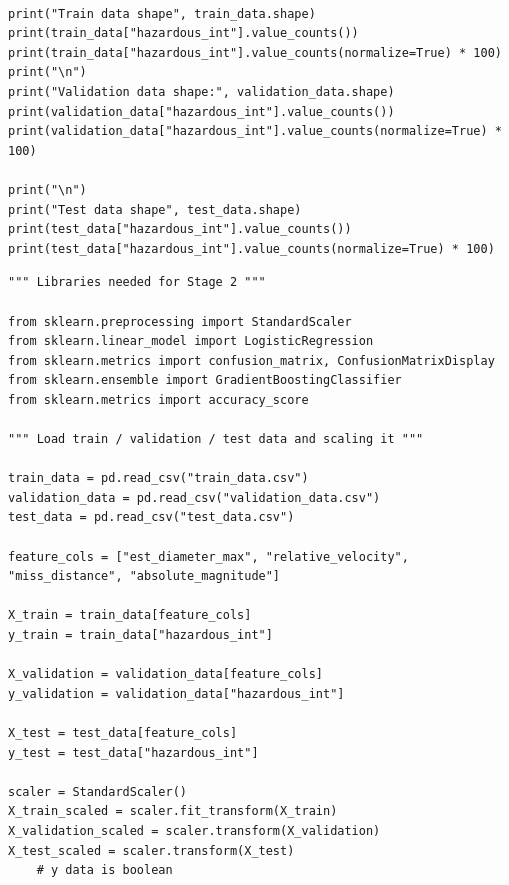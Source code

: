 \documentclass{article}
\begin{document}
\begin{lstlisting}

print("Train data shape", train_data.shape)
print(train_data["hazardous_int"].value_counts())
print(train_data["hazardous_int"].value_counts(normalize=True) * 100)
print("\n")
print("Validation data shape:", validation_data.shape)
print(validation_data["hazardous_int"].value_counts())
print(validation_data["hazardous_int"].value_counts(normalize=True) * 100)

print("\n")
print("Test data shape", test_data.shape)
print(test_data["hazardous_int"].value_counts())
print(test_data["hazardous_int"].value_counts(normalize=True) * 100)

\end{lstlisting}

\begin{lstlisting}
""" Libraries needed for Stage 2 """

from sklearn.preprocessing import StandardScaler
from sklearn.linear_model import LogisticRegression
from sklearn.metrics import confusion_matrix, ConfusionMatrixDisplay
from sklearn.ensemble import GradientBoostingClassifier
from sklearn.metrics import accuracy_score

""" Load train / validation / test data and scaling it """

train_data = pd.read_csv("train_data.csv")
validation_data = pd.read_csv("validation_data.csv")
test_data = pd.read_csv("test_data.csv")

feature_cols = ["est_diameter_max", "relative_velocity", "miss_distance", "absolute_magnitude"]

X_train = train_data[feature_cols]
y_train = train_data["hazardous_int"]

X_validation = validation_data[feature_cols]
y_validation = validation_data["hazardous_int"]

X_test = test_data[feature_cols]
y_test = test_data["hazardous_int"]

scaler = StandardScaler()
X_train_scaled = scaler.fit_transform(X_train)
X_validation_scaled = scaler.transform(X_validation)
X_test_scaled = scaler.transform(X_test)
    # y data is boolean
\end{lstlisting}
\end{document}
